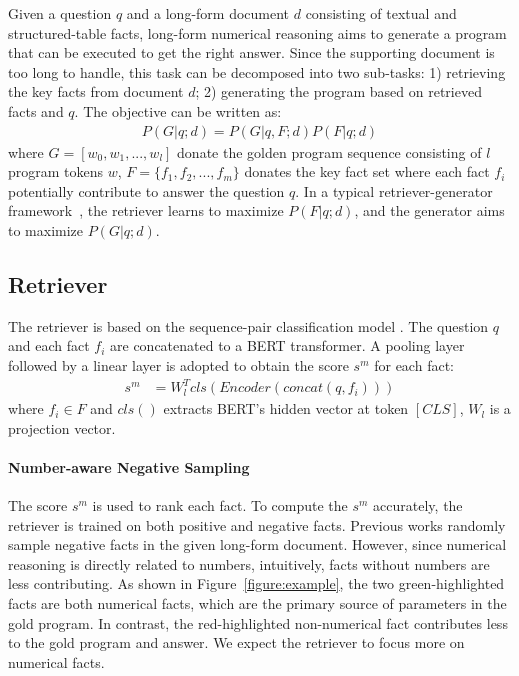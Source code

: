 \documentclass[11pt]{article}
\begin{document}
Given a question $q$ and a long-form document $d$ consisting of textual and structured-table facts, long-form numerical reasoning aims to generate a program that can be executed to get the right answer. Since the supporting document is too long to handle, this task can be decomposed into two sub-tasks: 1) retrieving the key facts from document $d$; 2) generating the program based on retrieved facts and $q$. The objective can be written as:
\begin{equation}
\begin{aligned}
P(G|q;d) = P(G|q,F;d)P(F|q;d)  
\end{aligned}
\end{equation}
where $G = [w_0,w_1,...,w_l]$ donate the golden program sequence consisting of $l$ program tokens $w$, $F=\{f_1,f_2,...,f_m\}$ donates the key fact set where each fact $f_i$ potentially contribute to answer the question $q$. 
In a typical retriever-generator framework~\cite{chen2021finqa}, the retriever learns to maximize $P(F|q;d)$, and the generator aims to  maximize $P(G|q;d)$. 











\subsection{Retriever}
\label{sec:retriever}


The retriever is based on the sequence-pair classification model \citet{nogueira2019passage}. The question $q$ and each fact $f_i$ are concatenated to a BERT \cite{bert} transformer. A pooling layer followed by a linear layer is adopted to obtain the score $s^m$ for each fact:
\begin{equation}
\begin{aligned}
s^m &= W_l^{T}cls(Encoder(concat(q,f_i)))
\end{aligned}
\end{equation}
where $f_i \in F$ and $cls()$ extracts BERT’s hidden vector at token $[CLS]$, $W_l$ is a projection vector.
\paragraph{Number-aware Negative Sampling}
The score $s^m$ is used to rank each fact. To compute the $s^m$ accurately, the retriever is trained on both positive and negative facts. Previous works \cite{chen2021finqa,convfinqa,wang2022numerical} randomly sample negative facts in the given long-form document. However, since numerical reasoning is directly related to numbers, intuitively, facts without numbers are less contributing. As shown in Figure~\ref{figure:example}, the two green-highlighted facts are both numerical facts, which are the primary source of parameters in the gold program. In contrast, the red-highlighted non-numerical fact contributes less to the gold program and answer. We expect the retriever to focus more on numerical facts. 
\end{document}
